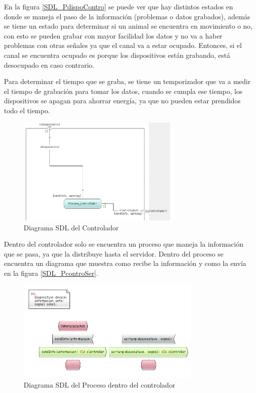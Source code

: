 \pagebreak

En la figura \ref{SDL_PdispoContro} se puede ver que hay distintos estados en donde se maneja el paso de la información (problemas o datos grabados), además se tiene un estado para determinar si un animal se encuentra en movimiento o no, con esto se pueden grabar con mayor facilidad los datos y no va a haber problemas con otras señales ya que el canal va a estar ocupado. Entonces, si el canal se encuentra ocupado es porque los dispositivos están grabando, está desocupado en caso contrario.

Para determinar el tiempo que se graba, se tiene un temporizador que va a medir el tiempo de grabación para tomar los datos, cuando se cumpla ese tiempo, los dispositivos se apagan para ahorrar energía, ya que no pueden estar prendidos todo el tiempo.

\begin{figure}[h]
    \centering
    \includegraphics[width=0.7\textwidth]{images/SDL_Controlador.png}
    \caption{Diagrama SDL del Controlador}
    \label{SDL_Controlador}
\end{figure}

\pagebreak

Dentro del controlador solo se encuentra un proceso que maneja la información que se pasa, ya que la distribuye hasta el servidor. Dentro del proceso se encuentra un diagrama que muestra como recibe la información y como la envía en la figura \ref{SDL_PcontroSer}.

\begin{figure}[h]
    \centering
    \includegraphics[width=0.8\textwidth]{images/SDL_ProcesoControSer.png}
    \caption{Diagrama SDL del Proceso dentro del controlador}
    \label{SDL_Pcontro}
\end{figure}

